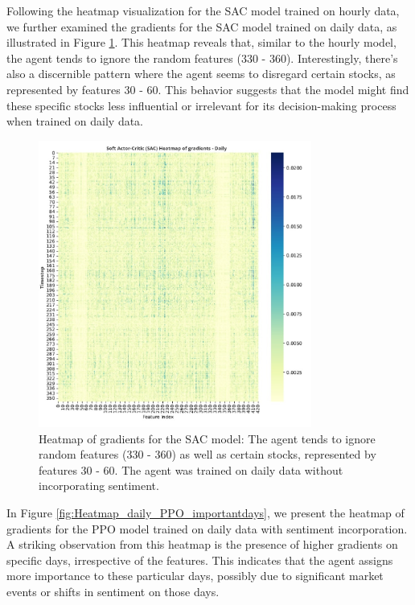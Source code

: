 \documentclass[12pt]{article}
\begin{document}
Following the heatmap visualization for the SAC model trained on hourly data, we further examined the gradients for the SAC model trained on daily data, as illustrated in Figure \ref{fig:Heatmap_daily_SAC_random}. This heatmap reveals that, similar to the hourly model, the agent tends to ignore the random features (330 - 360). Interestingly, there's also a discernible pattern where the agent seems to disregard certain stocks, as represented by features 30 - 60. This behavior suggests that the model might find these specific stocks less influential or irrelevant for its decision-making process when trained on daily data.


\begin{figure}[h]
    \centering
    \includegraphics[width=0.8\textwidth]{figs/Heatmap_daily_SAC_random.jpg}
    \caption{Heatmap of gradients for the SAC model: The agent tends to ignore random features (330 - 360) as well as certain stocks, represented by features 30 - 60. The agent was trained on daily data without incorporating sentiment.}

    \label{fig:Heatmap_daily_SAC_random}
\end{figure}


In Figure \ref{fig:Heatmap_daily_PPO_importantdays}, we present the heatmap of gradients for the PPO model trained on daily data with sentiment incorporation. A striking observation from this heatmap is the presence of higher gradients on specific days, irrespective of the features. This indicates that the agent assigns more importance to these particular days, possibly due to significant market events or shifts in sentiment on those days.
\end{document}
